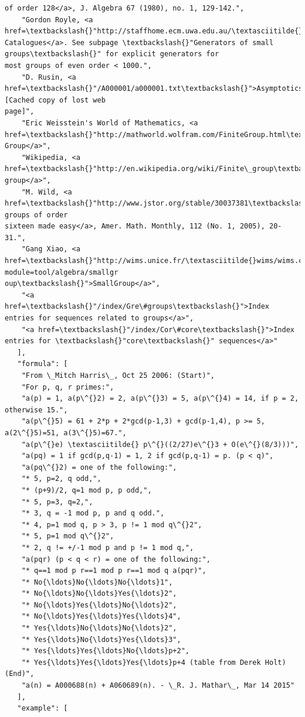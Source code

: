 \documentclass[11pt]{article}
\begin{document}
\begin{Verbatim}[commandchars=\\\{\}]
of order 128</a>, J. Algebra 67 (1980), no. 1, 129-142.",
    "Gordon Royle, <a
href=\textbackslash{}"http://staffhome.ecm.uwa.edu.au/\textasciitilde{}00013890/data.html\textbackslash{}">Combinatorial
Catalogues</a>. See subpage \textbackslash{}"Generators of small groups\textbackslash{}" for explicit generators for
most groups of even order < 1000.",
    "D. Rusin, <a href=\textbackslash{}"/A000001/a000001.txt\textbackslash{}">Asymptotics</a> [Cached copy of lost web
page]",
    "Eric Weisstein's World of Mathematics, <a
href=\textbackslash{}"http://mathworld.wolfram.com/FiniteGroup.html\textbackslash{}">Finite Group</a>",
    "Wikipedia, <a href=\textbackslash{}"http://en.wikipedia.org/wiki/Finite\_group\textbackslash{}">Finite group</a>",
    "M. Wild, <a href=\textbackslash{}"http://www.jstor.org/stable/30037381\textbackslash{}">The groups of order
sixteen made easy</a>, Amer. Math. Monthly, 112 (No. 1, 2005), 20-31.",
    "Gang Xiao, <a href=\textbackslash{}"http://wims.unice.fr/\textasciitilde{}wims/wims.cgi?module=tool/algebra/smallgr
oup\textbackslash{}">SmallGroup</a>",
    "<a href=\textbackslash{}"/index/Gre\#groups\textbackslash{}">Index entries for sequences related to groups</a>",
    "<a href=\textbackslash{}"/index/Cor\#core\textbackslash{}">Index entries for \textbackslash{}"core\textbackslash{}" sequences</a>"
   ],
   "formula": [
    "From \_Mitch Harris\_, Oct 25 2006: (Start)",
    "For p, q, r primes:",
    "a(p) = 1, a(p\^{}2) = 2, a(p\^{}3) = 5, a(p\^{}4) = 14, if p = 2, otherwise 15.",
    "a(p\^{}5) = 61 + 2*p + 2*gcd(p-1,3) + gcd(p-1,4), p >= 5, a(2\^{}5)=51, a(3\^{}5)=67.",
    "a(p\^{}e) \textasciitilde{} p\^{}((2/27)e\^{}3 + O(e\^{}(8/3)))",
    "a(pq) = 1 if gcd(p,q-1) = 1, 2 if gcd(p,q-1) = p. (p < q)",
    "a(pq\^{}2) = one of the following:",
    "* 5, p=2, q odd,",
    "* (p+9)/2, q=1 mod p, p odd,",
    "* 5, p=3, q=2,",
    "* 3, q = -1 mod p, p and q odd.",
    "* 4, p=1 mod q, p > 3, p != 1 mod q\^{}2",
    "* 5, p=1 mod q\^{}2",
    "* 2, q != +/-1 mod p and p != 1 mod q,",
    "a(pqr) (p < q < r) = one of the following:",
    "* q==1 mod p r==1 mod p r==1 mod q a(pqr)",
    "* No{\ldots}No{\ldots}No{\ldots}1",
    "* No{\ldots}No{\ldots}Yes{\ldots}2",
    "* No{\ldots}Yes{\ldots}No{\ldots}2",
    "* No{\ldots}Yes{\ldots}Yes{\ldots}4",
    "* Yes{\ldots}No{\ldots}No{\ldots}2",
    "* Yes{\ldots}No{\ldots}Yes{\ldots}3",
    "* Yes{\ldots}Yes{\ldots}No{\ldots}p+2",
    "* Yes{\ldots}Yes{\ldots}Yes{\ldots}p+4 (table from Derek Holt) (End)",
    "a(n) = A000688(n) + A060689(n). - \_R. J. Mathar\_, Mar 14 2015"
   ],
   "example": [

\end{Verbatim}
\end{document}
